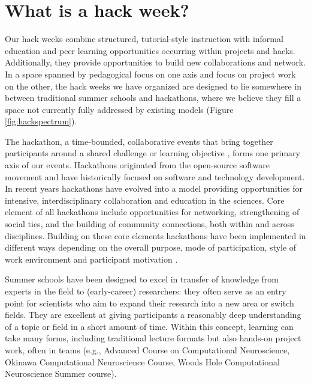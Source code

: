 \section*{What is a hack week?}

Our hack weeks combine structured, tutorial-style instruction with informal education and peer learning opportunities occurring within projects and hacks. Additionally, they provide opportunities to build new collaborations and network. In a space spanned by pedagogical focus on one axis and focus on project work on the other, the hack weeks we have organized are designed to lie somewhere in between traditional summer schools and hackathons, where we believe they fill a space not currently fully addressed by existing models (Figure \ref{fig:hackspectrum}).

The hackathon, a time-bounded, collaborative events that bring together participants around a shared challenge or learning objective \cite{Decker2015}, forms one primary axis of our events. 
Hackathons originated from the open-source software movement and have historically focused on software and technology development. 
In recent years hackathons have evolved into a model providing opportunities for intensive, interdisciplinary collaboration \cite{Groen2015-cj} and education \cite{Kienzler2015-zu,Lamers2014-xf} in the sciences. 
Core element of all hackathons include opportunities for networking, strengthening of social ties, and the building of community connections, both within and across disciplines.
Building on these core elements hackathons have been implemented in different ways depending on the overall purpose, mode of participation, style of work environment and participant motivation \cite{Drouhard2017}. 

Summer schools have been designed to excel in transfer of knowledge from experts in the field to (early-career) researchers: they often serve as an entry point for scientists who aim to expand their research into a new area or switch fields. They are excellent at giving participants a reasonably deep understanding of a topic or field in a short amount of time. Within this concept, learning can take many forms, including traditional lecture formats but also hands-on project work, often in teams (e.g., Advanced Course on Computational Neuroscience, Okinawa Computational Neuroscience Course, Woods Hole Computational Neuroscience Summer course). 

